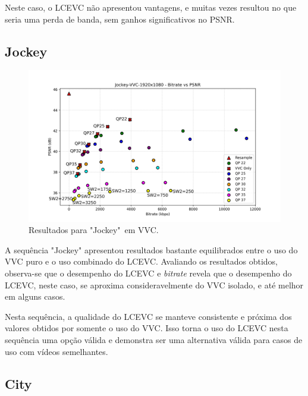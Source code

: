 Neste caso, o \acrshort{LCEVC} não apresentou vantagens, e muitas vezes
resultou no que seria uma perda de banda, sem ganhos significativos no
\acrshort{PSNR}.

\newpage
\subsection{Jockey}

\begin{figure}[h]
    \centering
    \includegraphics[width=1.0\textwidth]{img/Jockey-VVC.png}
    \caption{Resultados para "Jockey"\ em \acrshort{VVC}. \cite{uvg_dataset}}
    \label{fig:Jockey-VVC}
\end{figure}

A sequência "Jockey" apresentou resultados bastante equilibrados entre o uso do 
\acrshort{VVC} puro e o uso combinado do \acrshort{LCEVC}. Avaliando os  resultados
obtidos, observa-se que o desempenho do \acrshort{LCEVC} e \textit{bitrate} revela
que o desempenho do \acrshort{LCEVC}, neste caso, se aproxima consideravelmente do
\acrshort{VVC} isolado, e até melhor em alguns casos.

Nesta sequência, a qualidade do \acrshort{LCEVC} se manteve consistente e próxima
dos valores obtidos por somente o uso do \acrshort{VVC}. Isso torna o uso do 
\acrshort{LCEVC} nesta sequência uma opção válida e demonstra ser uma alternativa
válida para casos de uso com vídeos semelhantes.

\newpage
\subsection{City}

